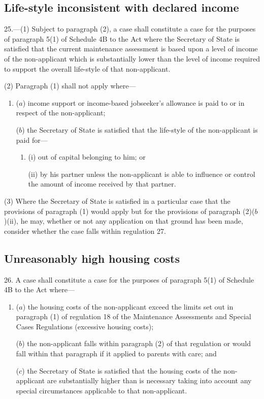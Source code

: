 \documentclass[a4paper]{article}
\begin{document}
\subsection[25. Life-style inconsistent with declared income]{Life-style inconsistent with declared income}

25.—(1) Subject to paragraph (2), a
case shall constitute a case for the purposes of paragraph 5(1) of Schedule 4B
to the Act where the Secretary of State is satisfied that the current
maintenance assessment is based upon a level of income of the non-applicant
which is substantially lower than the level of income required to support the
overall life-style of that non-applicant.

(2) Paragraph (1) shall not apply where—
\begin{enumerate}\item[]
($a$) income support or income-based jobseeker’s allowance is paid to or in respect
of the non-applicant;

($b$) the Secretary of State is satisfied that the life-style of the non-applicant
is paid for—
\begin{enumerate}\item[]
(i) out of capital belonging to him; or

(ii) by his partner unless the non-applicant is able to influence or control the
amount of income received by that partner.
\end{enumerate}
\end{enumerate}

(3) Where the Secretary of State is satisfied in a particular case that the
provisions of paragraph (1) would apply but for the provisions of paragraph
(2)($b$)(ii), he may, whether or not any application on that ground has been made,
consider whether the case falls within regulation 27.

\subsection[26. Unreasonably high housing costs]{Unreasonably high housing costs}

26. A case shall constitute a case for the
purposes of paragraph 5(1) of Schedule 4B to the Act where—
\begin{enumerate}\item[]
($a$) the housing costs of the non-applicant exceed the limits set out in paragraph
(1) of regulation 18 of the Maintenance Assessments and Special Cases
Regulations (excessive housing costs);

($b$) the non-applicant falls within paragraph (2) of that regulation or would fall
within that paragraph if it applied to parents with care; and

($c$) the Secretary of State is satisfied that the housing costs of the
non-applicant are substantially higher than is necessary taking into account any
special circumstances applicable to that non-applicant.
\end{enumerate}
\end{document}
